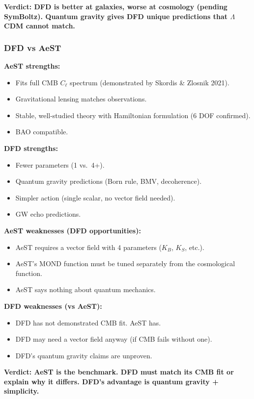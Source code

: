 \documentclass[11pt,a4paper]{article}
\begin{document}
\textbf{Verdict: DFD is better at galaxies, worse at cosmology (pending SymBoltz). Quantum gravity gives DFD unique predictions that $\Lambda$CDM cannot match.}

\subsubsection{DFD vs AeST}

\textbf{AeST strengths:}
\begin{itemize}
\item Fits full CMB $C_\ell$ spectrum (demonstrated by Skordis \& Zlosnik 2021).
\item Gravitational lensing matches observations.
\item Stable, well-studied theory with Hamiltonian formulation (6 DOF confirmed).
\item BAO compatible.
\end{itemize}

\textbf{DFD strengths:}
\begin{itemize}
\item Fewer parameters (1 vs.\ 4+).
\item Quantum gravity predictions (Born rule, BMV, decoherence).
\item Simpler action (single scalar, no vector field needed).
\item GW echo predictions.
\end{itemize}

\textbf{AeST weaknesses (DFD opportunities):}
\begin{itemize}
\item AeST requires a vector field with 4 parameters ($K_B$, $K_S$, etc.).
\item AeST's MOND function must be tuned separately from the cosmological function.
\item AeST says nothing about quantum mechanics.
\end{itemize}

\textbf{DFD weaknesses (vs AeST):}
\begin{itemize}
\item DFD has not demonstrated CMB fit. AeST has.
\item DFD may need a vector field anyway (if CMB fails without one).
\item DFD's quantum gravity claims are unproven.
\end{itemize}

\textbf{Verdict: AeST is the benchmark. DFD must match its CMB fit or explain why it differs. DFD's advantage is quantum gravity + simplicity.}
\end{document}
